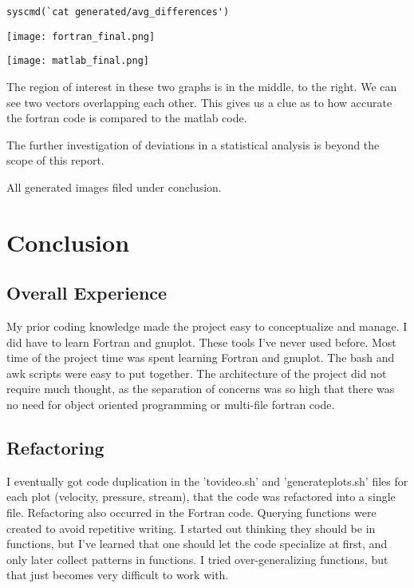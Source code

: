 \documentclass[listof=totoc]{report}
\begin{document}
\begin{verbatim}
syscmd(`cat generated/avg_differences')
\end{verbatim}
\begin{center}
\texttt{[image: fortran\_final.png]}
\end{center}
\begin{center}
\texttt{[image: matlab\_final.png]}
\end{center}

The region of interest in these two graphs is in the middle, to the right. We can see two vectors overlapping each other. This gives us a clue as to how accurate the fortran code is compared to the matlab code.

The further investigation of deviations in a statistical analysis is beyond the scope of this report.

All generated images filed under conclusion.


\chapter{Conclusion}
\section{Overall Experience}
My prior coding knowledge made the project easy to conceptualize and manage. I did have to learn Fortran and gnuplot. These tools I've never used before. Most time of the project time was spent learning Fortran and gnuplot. The bash and awk scripts were easy to put together. The architecture of the project did not require much thought, as the separation of concerns was so high that there was no need for object oriented programming or multi-file fortran code.

\section{Refactoring}
I eventually got code duplication in the 'tovideo.sh' and 'generate\textunderscore plots.sh' files for each plot (velocity, pressure, stream), that the code was refactored into a single file. Refactoring also occurred in the Fortran code. Querying functions were created to avoid repetitive writing. I started out thinking they should be in functions, but I've learned that one should let the code specialize at first, and only later collect patterns in functions. I tried over-generalizing functions, but that just becomes very difficult to work with.
\end{document}
